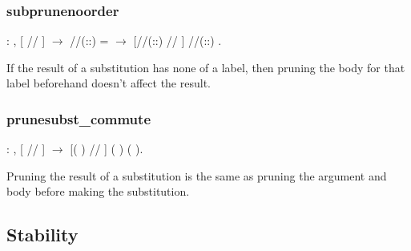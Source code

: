 \documentclass[12pt]{report}
\begin{document}
\subsubsection{subprunenoorder}

\begin{coqdoccode}
\coqdocemptyline
\coqdocindent{1.00em}
  : \coqdockw{\ensuremath{\forall}}     ,\coqdoceol
\coqdocindent{2.00em}
[ // ]    \ensuremath{\rightarrow}\coqdoceol
\coqdocindent{2.00em}
//\coqdocvar{\_}(::) =  \ensuremath{\rightarrow}\coqdoceol
\coqdocindent{2.00em}
[//\coqdocvar{\_}(::) // ] //\coqdocvar{\_}(::)  .\coqdoceol
\coqdocemptyline
\end{coqdoccode}

If the result of a substitution has none of a label, then pruning
the body for that label beforehand doesn't affect the result. 

\subsubsection{prunesubst\_commute}

\begin{coqdoccode}
\coqdocemptyline
\coqdocindent{0.50em}
  : \coqdockw{\ensuremath{\forall}}     ,\coqdoceol
\coqdocindent{2.00em}
[ // ]    \ensuremath{\rightarrow}\coqdoceol
\coqdocindent{2.00em}
[(  ) // ] (  )  (  ).\coqdoceol
\coqdocemptyline
\end{coqdoccode}

Pruning the result of a substitution is the same as pruning the
argument and body before making the substitution. 

\subsection{Stability}
\end{document}
